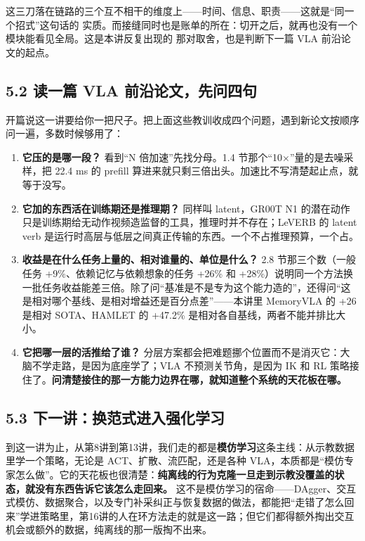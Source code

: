 \documentclass[
  chinese,
]{ctexart}
\providecommand{\tightlist}{%
  \setlength{\itemsep}{0pt}\setlength{\parskip}{0pt}}
\begin{document}
这三刀落在链路的三个互不相干的维度上------时间、信息、职责------这就是``同一个招式''这句话的
实质。而接缝同时也是账单的所在：切开之后，就再也没有一个模块能看见全局。这是本讲反复出现的
那对取舍，也是判断下一篇 VLA 前沿论文的起点。

\subsection{5.2 读一篇 VLA
前沿论文，先问四句}\label{ux8bfbux4e00ux7bc7-vla-ux524dux6cbfux8bbaux6587ux5148ux95eeux56dbux53e5}

开篇说这一讲要给你一把尺子。把上面这些教训收成四个问题，遇到新论文按顺序问一遍，多数时候够用了：

\begin{enumerate}
\def\labelenumi{\arabic{enumi}.}
\tightlist
\item
  \textbf{它压的是哪一段？} 看到``N 倍加速''先找分母。1.4
  节那个``10×''量的是去噪采样，把 22.4 ms 的 prefill
  算进来就只剩三倍出头。加速比不写清楚起止点，就等于没写。
\item
  \textbf{它加的东西活在训练期还是推理期？} 同样叫 latent，GR00T N1
  的潜在动作只是训练期给无动作视频造监督的工具，推理时并不存在；LeVERB
  的 latent verb
  是运行时高层与低层之间真正传输的东西。一个不占推理预算，一个占。
\item
  \textbf{收益是在什么任务上量的、相对谁量的、单位是什么？} 2.8
  节那三个数（一般任务 +9\%、依赖记忆与依赖想象的任务 +26\% 和
  +28\%）说明同一个方法换一批任务收益能差三倍。除了问``基准是不是专为这个能力造的''，还得问``这是相对哪个基线、是相对增益还是百分点差''------本讲里
  MemoryVLA 的 +26 是相对 SOTA、HAMLET 的 +47.2\%
  是相对各自基线，两者不能并排比大小。
\item
  \textbf{它把哪一层的活推给了谁？}
  分层方案都会把难题挪个位置而不是消灭它：大脑不学走路，是因为底座学了；VLA
  不预测关节角，是因为 IK 和 RL
  策略接住了。\textbf{问清楚接住的那一方能力边界在哪，就知道整个系统的天花板在哪。}
\end{enumerate}

\subsection{5.3
下一讲：换范式进入强化学习}\label{ux4e0bux4e00ux8bb2ux6362ux8303ux5f0fux8fdbux5165ux5f3aux5316ux5b66ux4e60}

到这一讲为止，从第8讲到第13讲，我们走的都是\textbf{模仿学习}这条主线：从示教数据里学一个策略，无论是
ACT、扩散、流匹配，还是各种
VLA，本质都是``模仿专家怎么做''。它的天花板也很清楚：\textbf{纯离线的行为克隆一旦走到示教没覆盖的状态，就没有东西告诉它该怎么走回来。}
这不是模仿学习的宿命------DAgger、交互式模仿、数据聚合，以及专门补采纠正与恢复数据的做法，都能把``走错了怎么回来''学进策略里，第16讲的人在环方法走的就是这一路；但它们都得额外掏出交互机会或额外的数据，纯离线的那一版掏不出来。
\end{document}
